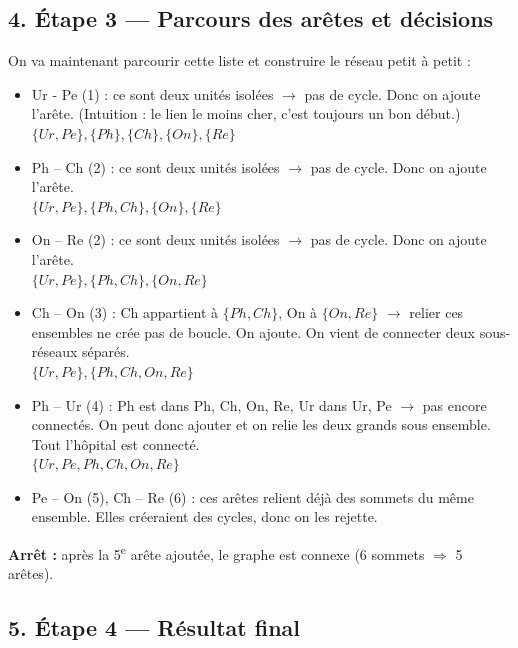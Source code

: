 \subsection*{4. Étape 3 — Parcours des arêtes et décisions}
On va maintenant parcourir cette liste et construire le réseau petit à petit :
\begin{itemize}
    \item Ur - Pe (1) : ce sont deux unités isolées $\rightarrow$ pas de cycle. Donc on ajoute l'arête. (Intuition : le lien le moins cher, c’est toujours un bon début.) \\
    $\{Ur, Pe\}, \{Ph\}, \{Ch\}, \{On\}, \{Re\}$

    \item Ph – Ch (2) : ce sont deux unités isolées $\rightarrow$ pas de cycle. Donc on ajoute l'arête. \\
    $\{Ur, Pe\}, \{Ph, Ch\}, \{On\}, \{Re\}$

    \item On – Re (2) :  ce sont deux unités isolées $\rightarrow$ pas de cycle. Donc on ajoute l'arête. \\
    $\{Ur, Pe\}, \{Ph, Ch\}, \{On, Re\}$ 

    \item Ch – On (3) : Ch appartient à $\{Ph, Ch\}$, On à $\{On, Re\}$ $\rightarrow$ relier ces ensembles ne crée pas de boucle. On ajoute. On vient de connecter deux sous-réseaux séparés. \\
    $\{Ur, Pe\}, \{Ph, Ch, On, Re\}$ 

    \item Ph – Ur (4) : Ph est dans {Ph, Ch, On, Re}, Ur dans {Ur, Pe} $\rightarrow$ pas encore connectés. On peut donc ajouter et on relie les deux grands sous ensemble. Tout l'hôpital est connecté. \\
    $\{Ur, Pe, Ph, Ch, On, Re\}$

    \item Pe – On (5), Ch – Re (6) : ces arêtes relient déjà des sommets du même ensemble. Elles créeraient des cycles, donc on les rejette.
    
\end{itemize}

\textbf{Arrêt :} après la 5\textsuperscript{e} arête ajoutée, le graphe est connexe (6 sommets $\Rightarrow$ 5 arêtes).

\subsection*{5. Étape 4 — Résultat final}

